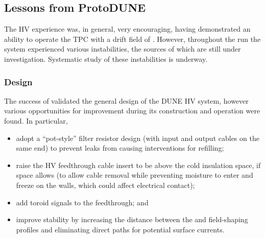 
\subsection{Lessons from ProtoDUNE}

\label{sec:fdsp-hv-protodune-lessons}
The  HV experience was, in general, very encouraging, having demonstrated 
an ability to operate the TPC with a drift field of \spmaxfield{}. %
However, throughout the run the system experienced various instabilities, the sources of which are %
still under investigation.
Systematic study of these instabilities is underway.

\subsubsection{Design}
\label{sec:fdsp-hv-protodune-lessons-design}

The success of  validated the general design of the DUNE HV system, however various opportunities for improvement during its construction and operation were found. In particular,

\begin{itemize}
\item adopt a ``pot-style'' filter resistor design (with input and output cables on the same end) %
to prevent leaks from causing interventions for refilling;
\item raise the HV feedthrough cable insert to be above the cold insulation space, if space allows (to allow cable removal while preventing moisture to enter and freeze on the walls, which could affect electrical contact);
\item add toroid signals %
to the feedthrough; and
\item improve stability by increasing the distance between the  and field-shaping profiles and eliminating direct paths for potential surface currents.
\end{itemize}

